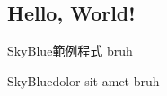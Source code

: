 \documentclass{article}
\begin{document}

\begin{large}

\section{Hello, World!}
\begin{boxpar}{SkyBlue}{範例程式}
    bruh
\end{boxpar}

\begin{boxpar}{SkyBlue}{dolor sit amet}
    bruh
\end{boxpar}

\end{large}
\end{document}

